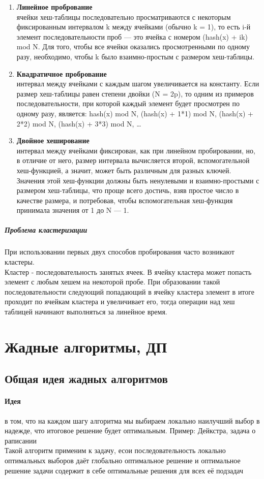 \documentclass[a4paper,10pt]{article}
\begin{document}
\begin{enumerate}
	\item \textbf{Линейное пробрование}\\
 ячейки хеш-таблицы последовательно просматриваются с некоторым фиксированным интервалом k между ячейками (обычно k = 1), то есть i-й элемент последовательности проб — это ячейка с номером (hash(x) + ik) mod N. Для того, чтобы все ячейки оказались просмотренными по одному разу, необходимо, чтобы k было взаимно-простым с размером хеш-таблицы.
	\item \textbf{Квадратичное пробрование}\\
интервал между ячейками с каждым шагом увеличивается на константу. Если размер хеш-таблицы равен степени двойки (N = 2p), то одним из примеров последовательности, при которой каждый элемент будет просмотрен по одному разу, является:
hash(x) mod N, (hash(x) + 1*1) mod N, (hash(x) + 2*2) mod N, (hash(x) + 3*3) mod N, …
	\item \textbf{Двойное хеширование}\\
интервал между ячейками фиксирован, как при линейном пробировании, но, в отличие от него, размер интервала вычисляется второй, вспомогательной хеш-функцией, а значит, может быть различным для разных ключей. Значения этой хеш-функции должны быть ненулевыми и взаимно-простыми с размером хеш-таблицы, что проще всего достичь, взяв простое число в качестве размера, и потребовав, чтобы вспомогательная хеш-функция принимала значения от 1 до N — 1.
\end{enumerate}
\subparagraph{Проблема кластеризации}
При использовании первых двух способов пробирования часто возникают кластеры.\\
Кластер - последовательность занятых ячеек. В ячейку кластера может попасть элемент с любым хешем на некоторой пробе. При образовании такой последовательности следующий попадающий в ячейку кластера элемент в итоге проходит по ячейкам кластера и увеличивает его, тогда операции над хеш таблицей начинают выполняться за линейное время.
\section{Жадные алгоритмы, ДП}
\subsection{Общая идея жадных алгоритмов}
\paragraph{Идея} в том, что на каждом шагу алгоритма мы выбираем локально наилучший выбор в надежде, что итоговое решение будет оптимальным. Пример: Дейкстра, задача о раписании \\
Такой алгоритм применим к задачу, есои последовательность локально оптимальных выборов даёт глобально оптимальное решение и оптимальное решение задачи содержит в себе оптимальные решения для всех её подзадач \\
\end{document}
